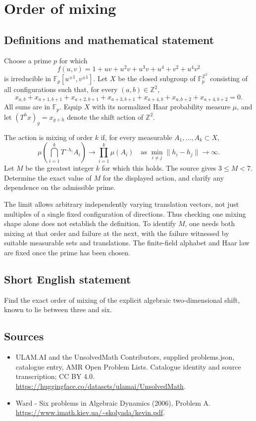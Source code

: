\documentclass[11pt,a4paper]{article}
\begin{document}
\section*{Order of mixing}\label{statement}

\subsection{Definitions and mathematical statement}
Choose a prime $p$ for which
\[
 f(u,v)=1+uv+u^2v+u^3v+u^4+v^2+u^4v^2
\]
is irreducible in $\mathbb F_p[u^{\pm1},v^{\pm1}]$. Let $X$ be the closed
subgroup of $\mathbb F_p^{\mathbb Z^2}$ consisting of all configurations
such that, for every $(a,b)\in\mathbb Z^2$,
\[
 x_{a,b}+x_{a+1,b+1}+x_{a+2,b+1}+x_{a+3,b+1}
 +x_{a+4,b}+x_{a,b+2}+x_{a+4,b+2}=0.
\]
All sums are in $\mathbb F_p$. Equip $X$ with its normalized Haar
probability measure $\mu$, and let $(T^h x)_g=x_{g+h}$ denote the shift
action of $\mathbb Z^2$.

The action is mixing of order $k$ if, for every measurable
$A_1,\ldots,A_k\subset X$,
\[
 \mu\!\left(\bigcap_{i=1}^kT^{-h_i}A_i\right)
       \longrightarrow\prod_{i=1}^k\mu(A_i)
 \quad\text{as }\min_{i\ne j}\|h_i-h_j\|\longrightarrow\infty.
\]
Let $M$ be the greatest integer $k$ for which this holds. The source gives
$3\le M<7$. Determine the exact value of $M$ for the displayed action,
and clarify any dependence on the admissible prime.

The limit allows arbitrary independently varying translation vectors,
not just multiples of a single fixed configuration of directions. Thus
checking one mixing shape alone does not establish the definition. To
identify $M$, one needs both mixing at that order and failure at the next,
with the failure witnessed by suitable measurable sets and translations.
The finite-field alphabet and Haar law are fixed once the prime has been chosen.
\subsection{Short English statement}
Find the exact order of mixing of the explicit algebraic two-dimensional shift, known to lie between three and six.
\subsection{Sources}
\begin{itemize}
\item[S1] ULAM.AI and the UnsolvedMath Contributors, supplied problems.json, catalogue entry, AMR Open Problem Lists. Catalogue identity and source transcription; CC BY 4.0.
\url{https://huggingface.co/datasets/ulamai/UnsolvedMath}.
\item[S2] Ward - Six problems in Algebraic Dynamics (2006), Problem A. 
\url{https://www.imath.kiev.ua/~skolyada/kevin.pdf}.
\end{itemize}
\end{document}
